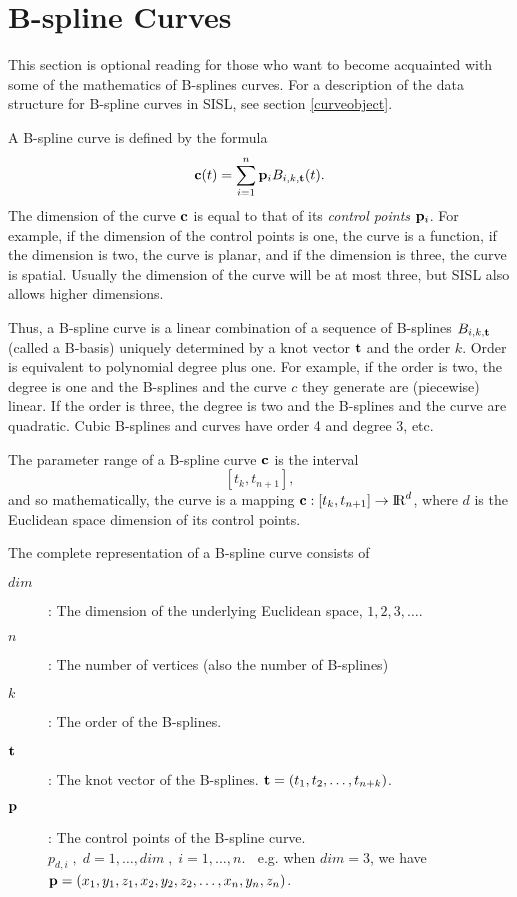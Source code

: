 \section{B-spline Curves}

This section is optional reading for those who want to
become acquainted with some of the mathematics of
B-splines curves. For a description of the data structure for
B-spline curves in SISL, see section \ref{curveobject}.

A B-spline curve is defined by the formula
$$ {\bf c}(t) = \sum_{i=1}^{n} {\bf p}_{i} B_{i,k,{\bf t}}(t). $$
The dimension of the curve ${\bf c}$ is equal to that of its
{\it control points} ${\bf p}_i$. For example, if the dimension of the
control points
is one, the curve is a function, if the dimension is two,
the curve is planar, and if the dimension is three,
the curve is spatial.
Usually the dimension of the curve will be at most three,
but SISL also allows higher dimensions.

Thus, a B-spline curve is a linear combination of a sequence of B-splines
$B_{i,k,{\bf t}}$ (called a B-basis)
uniquely determined by a knot vector ${\bf t}$ and
the order $k$. Order is equivalent to polynomial degree plus one.
For example, if the order is two, the degree is one and the B-splines
and the curve $c$ they generate are (piecewise) linear.
If the order is three, the degree is two and the B-splines and
the curve are quadratic. Cubic B-splines and
curves have order 4 and degree 3, etc.

The parameter range of a B-spline curve ${\bf c}$ is the interval
$$ [t_k, t_{n+1}], $$
and so mathematically, the curve is a mapping
${\bf c}: [t_k, t_{n+1}] \to \hbox{\rm I\negthinspace R}^d$, where $d$ is the Euclidean space
dimension of its control points.

The complete representation of a B-spline curve consists of
\begin{description}
\item[$dim$]: The dimension of the underlying Euclidean space,
              $1,2,3,\ldots$.
\item[$n$]: The number of vertices (also the number of B-splines)
\item[$k$]: The order of the B-splines.
\item[${\bf t}$]: The knot vector of the B-splines.
            ${\bf t} = (t_1, t_2, \ldots, t_{n+k})$.
\item[${\bf p}$]: The control points of the B-spline curve.
           $p_{d,i}\;,\; d=1,\ldots,dim\;,\;
                i=1,\ldots,n.\;\;$
                e.g. when $dim = 3$, we have
                ${\bf p} = (x_1,y_1,z_1,x_2,y_2,z_2,\ldots,x_n,y_n,z_n)$.
\end{description}

